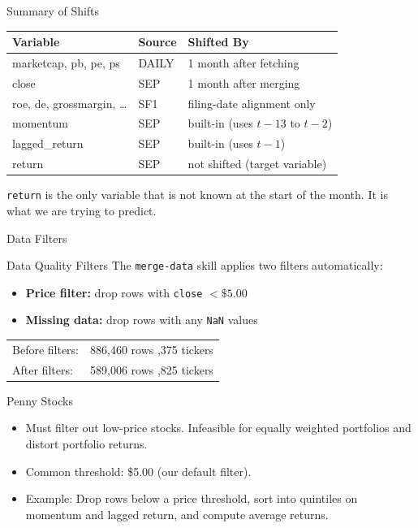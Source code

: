 \documentclass[aspectratio=169,t]{beamer}
\begin{document}
\begin{frame}{Summary of Shifts}
\begin{center}
\begin{tabular}{lll}
\toprule
\textbf{Variable} & \textbf{Source} & \textbf{Shifted By} \\
\midrule
marketcap, pb, pe, ps & DAILY & 1 month after fetching \\
close & SEP & 1 month after merging \\
roe, de, grossmargin, \ldots & SF1 & filing-date alignment only \\
momentum & SEP & built-in (uses $t{-}13$ to $t{-}2$) \\
lagged\_return & SEP & built-in (uses $t{-}1$) \\
return & SEP & not shifted (target variable) \\
\bottomrule
\end{tabular}
\end{center}
\vspace{0.3cm}
\texttt{return} is the \alert{only variable that is not known at the start of the month}.  It is what we are trying to predict.
\end{frame}


\begin{frame}[c]
\centering
\Huge Data Filters
\end{frame}

\begin{frame}{Data Quality Filters}
The \texttt{merge-data} skill applies two filters automatically:
\begin{itemize}
\item \textbf{Price filter:} drop rows with \texttt{close} $< \$5.00$
\item \textbf{Missing data:} drop rows with any \texttt{NaN} values
\end{itemize}

\begin{center}
\begin{tabular}{lr}
\toprule
Before filters: & 886,460 rows \quad 9,375 tickers \\
After filters: & 589,006 rows \quad 6,825 tickers \\
\bottomrule
\end{tabular}
\end{center}
\end{frame}

\begin{frame}{Penny Stocks}
\begin{itemize}
\item Must filter out low-price stocks.  Infeasible for equally weighted portfolios and distort portfolio returns.
\item Common threshold: \$5.00 (our default filter).
\item Example: Drop rows below a price threshold, sort into quintiles on momentum and lagged return, and compute average returns.
\end{itemize}
\end{frame}
\end{document}
